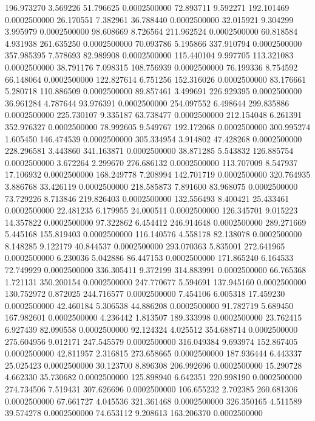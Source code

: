 196.973270 3.569226 51.796625 0.0002500000
72.893711 9.592271 192.101469 0.0002500000
26.170551 7.382961 36.788440 0.0002500000
32.015921 9.304299 3.995979 0.0002500000
98.608669 8.726564 211.962524 0.0002500000
60.818584 4.931938 261.635250 0.0002500000
70.093786 5.195866 337.910794 0.0002500000
357.985395 7.578693 82.989908 0.0002500000
115.440104 9.997705 113.321083 0.0002500000
38.791176 7.098315 108.756939 0.0002500000
76.199336 8.754592 66.148064 0.0002500000
122.827614 6.751256 152.316026 0.0002500000
83.176661 5.280718 110.886509 0.0002500000
89.857461 3.499691 226.929395 0.0002500000
36.961284 4.787644 93.976391 0.0002500000
254.097552 6.498644 299.835886 0.0002500000
225.730107 9.335187 63.738477 0.0002500000
212.154048 6.261391 352.976327 0.0002500000
78.992605 9.549767 192.172068 0.0002500000
300.995274 1.605450 146.474539 0.0002500000
305.334954 3.914802 47.428268 0.0002500000
228.296581 3.443860 341.163871 0.0002500000
38.871285 5.543832 126.885754 0.0002500000
3.672264 2.299670 276.686132 0.0002500000
113.707009 8.547937 17.106932 0.0002500000
168.249778 7.208994 142.701719 0.0002500000
320.764935 3.886768 33.426119 0.0002500000
218.585873 7.891600 83.968075 0.0002500000
73.729226 8.713846 219.826403 0.0002500000
132.556493 8.400421 25.433461 0.0002500000
22.481235 6.179955 24.000511 0.0002500000
126.345701 9.015223 14.357822 0.0002500000
97.322862 6.454412 246.914648 0.0002500000
289.271669 5.445168 155.819403 0.0002500000
116.140576 4.558178 82.138078 0.0002500000
8.148285 9.122179 40.844537 0.0002500000
293.070363 5.835001 272.641965 0.0002500000
6.230036 5.042886 86.447153 0.0002500000
171.865240 6.164533 72.749929 0.0002500000
336.305411 9.372199 314.883991 0.0002500000
66.765368 1.721131 350.200154 0.0002500000
247.770677 5.594691 137.945160 0.0002500000
130.752972 0.872025 244.716577 0.0002500000
7.454106 6.005318 17.459230 0.0002500000
42.460184 5.306538 44.886208 0.0002500000
91.782719 5.689450 167.982601 0.0002500000
4.236442 1.813507 189.333998 0.0002500000
23.762415 6.927439 82.090558 0.0002500000
92.124324 4.025512 354.688714 0.0002500000
275.604956 9.012171 247.545579 0.0002500000
316.049384 9.693974 152.867405 0.0002500000
42.811957 2.316815 273.658665 0.0002500000
187.936444 6.443337 25.025423 0.0002500000
30.123700 8.896308 206.992696 0.0002500000
15.290728 4.662330 35.730682 0.0002500000
125.898940 6.642351 220.998190 0.0002500000
274.734506 7.519431 307.626696 0.0002500000
106.655232 2.702385 260.681306 0.0002500000
67.661727 4.045536 321.361468 0.0002500000
326.350165 4.511589 39.574278 0.0002500000
74.653112 9.208613 163.206370 0.0002500000
